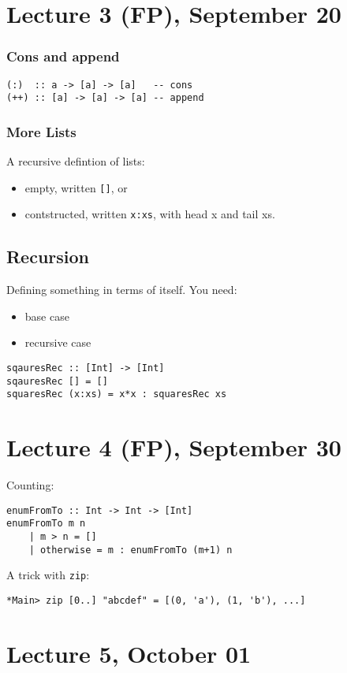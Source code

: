\documentclass{article}
\begin{document}
\section{Lecture 3 (FP), September 20}
\subsubsection{Cons and append}
\begin{verbatim}
(:)  :: a -> [a] -> [a]   -- cons
(++) :: [a] -> [a] -> [a] -- append
\end{verbatim}
\subsubsection{More Lists}
A recursive defintion of lists:
\begin{itemize}
	\item empty, written \texttt{[]}, or
	\item contstructed, written \texttt{x:xs}, with head x and tail xs.
\end{itemize}
\subsection{Recursion}
Defining something in terms of itself.
You need:
\begin{itemize}
	\item base case
	\item recursive case
\end{itemize}
\begin{verbatim}
sqauresRec :: [Int] -> [Int]
sqauresRec [] = []
squaresRec (x:xs) = x*x : squaresRec xs
\end{verbatim}
\section{Lecture 4 (FP), September 30}
Counting:
\begin{verbatim}
enumFromTo :: Int -> Int -> [Int]
enumFromTo m n
    | m > n = []
    | otherwise = m : enumFromTo (m+1) n
\end{verbatim}
A trick with \texttt{zip}:
\begin{verbatim}
*Main> zip [0..] "abcdef" = [(0, 'a'), (1, 'b'), ...]
\end{verbatim}
\section{Lecture 5, October 01}
\end{document}

